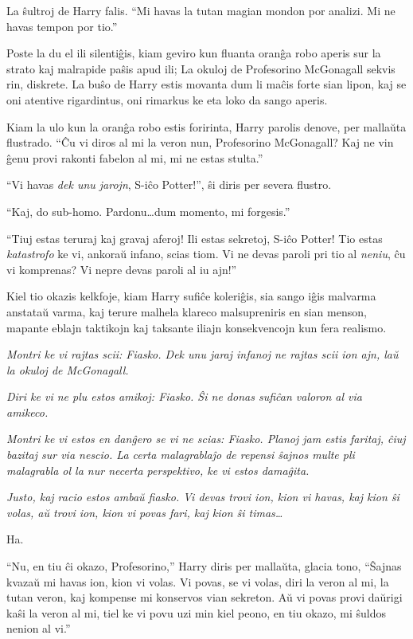 La ŝultroj de Harry falis. ``Mi havas la tutan magian mondon por
analizi. Mi ne havas tempon por tio.''

Poste la du el ili silentiĝis, kiam geviro kun fluanta oranĝa robo
aperis sur la strato kaj malrapide paŝis apud ili; La okuloj de
Profesorino McGonagall sekvis rin, diskrete. La buŝo de Harry estis
movanta dum li maĉis forte sian lipon, kaj se oni atentive
rigardintus, oni rimarkus ke eta loko da sango aperis.

Kiam la ulo kun la oranĝa robo estis foririnta, Harry parolis denove,
per mallaŭta flustrado. ``Ĉu vi diros al mi la veron nun, Profesorino
McGonagall? Kaj ne vin ĝenu provi rakonti fabelon al mi, mi ne estas
stulta.''

``Vi havas \emph{dek unu jarojn}, S-iĉo Potter!'', ŝi diris per severa
flustro.

``Kaj, do sub-homo. Pardonu\ldots dum momento, mi forgesis.''

``Tiuj estas teruraj kaj gravaj aferoj! Ili estas sekretoj, S-iĉo
Potter! Tio estas \emph{katastrofo} ke vi, ankoraŭ infano, scias
tiom. Vi ne devas paroli pri tio al \emph{neniu}, ĉu vi komprenas?  Vi
nepre devas paroli al iu ajn!''

Kiel tio okazis kelkfoje, kiam Harry sufiĉe koleriĝis, sia sango iĝis
malvarma anstataŭ varma, kaj terure malhela klareco malsupreniris en
sian menson, mapante eblajn taktikojn kaj taksante iliajn
konsekvencojn kun fera realismo.

\emph{Montri ke vi rajtas scii: Fiasko. Dek unu jaraj infanoj ne
rajtas scii ion ajn, laŭ la okuloj de McGonagall.}

\emph{Diri ke vi ne plu estos amikoj: Fiasko. Ŝi ne donas sufiĉan valoron al via amikeco.}

\emph{Montri ke vi estos en danĝero se vi ne scias: Fiasko. Planoj jam
  estis faritaj, ĉiuj bazitaj sur via nescio. La certa malagrablaĵo de
  repensi ŝajnos multe pli malagrabla ol la nur necerta perspektivo,
  ke vi estos damaĝita.}

\emph{Justo, kaj racio estos ambaŭ fiasko. Vi devas trovi ion, kion vi
havas, kaj kion ŝi volas, aŭ trovi ion, kion vi povas fari, kaj kion
ŝi timas\ldots}

Ha.

``Nu, en tiu ĉi okazo, Profesorino,'' Harry diris per mallaŭta, glacia
tono, ``Ŝajnas kvazaŭ mi havas ion, kion vi volas. Vi povas, se vi
volas, diri la veron al mi, la tutan veron, kaj kompense mi konservos
vian sekreton. Aŭ vi povas provi daŭrigi kaŝi la veron al mi, tiel ke
vi povu uzi min kiel peono, en tiu okazo, mi ŝuldos nenion al vi.''


